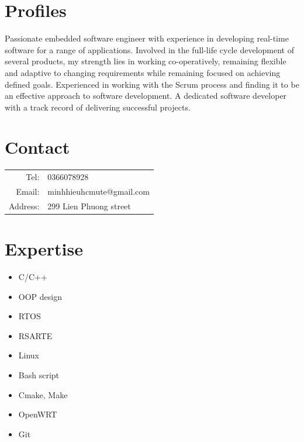 \documentclass[10pt,oneside,a4paper]{article}
\begin{document}
\begin{tcolorbox}
    \begin{minipage}[t]{8cm}
        \vspace*{-0.5cm}
        \begin{tcolorbox}[grow to left by=0.6cm, colback=gray!25,colframe=white]
            \section*{Profiles}
            Passionate embedded software engineer with experience in developing real-time software for a
            range of applications. Involved in the full-life cycle development of several products, my strength
            lies in working co-operatively, remaining flexible and adaptive to changing requirements while remaining
            focused on achieving defined goals. Experienced in working with the Scrum process and finding it to 
            be an effective approach to software development. A dedicated software developer with a track record of
            delivering successful projects.
            
            \section*{Contact}
            \begin{tabular}{r l}
                Tel: & 0366078928 \\
                Email: & minhhieuhcmute@gmail.com \\
                Address: & 299 Lien Phuong street
            \end{tabular}
            
            \section*{Expertise}
            \begin{itemize}
                \item {C/C++}
                \item {OOP design}
                \item {RTOS}
                \item {RSARTE}
                \item {Linux}
                \item {Bash script}
                \item {Cmake, Make}
                \item {OpenWRT}
                \item {Git}
            \end{itemize}
            

\end{tcolorbox}
\end{minipage}
\end{tcolorbox}
\end{document}
